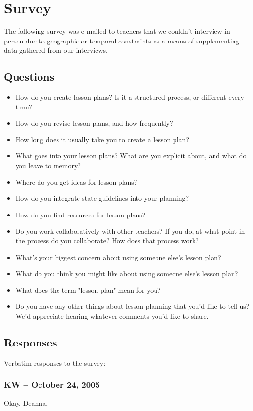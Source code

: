 \documentclass[10pt,letter]{article}
\begin{document}
\section{Survey}
The following survey was e-mailed to teachers that we couldn't interview in
person due to geographic or temporal constraints as a means of supplementing
data gathered from our interviews.

\subsection{Questions}
\begin{itemize}
\item How do you create lesson plans?  Is it a structured process, or different
      every time?
\item How do you revise lesson plans, and how frequently?
\item How long does it usually take you to create a lesson plan?
\item What goes into your lesson plans?  What are you explicit about, and what
      do you leave to memory?
\item Where do you get ideas for lesson plans?
\item How do you integrate state guidelines into your planning?
\item How do you find resources for lesson plans?
\item Do you work collaboratively with other teachers?  If you do, at what point
      in the process do you collaborate?  How does that process work?
\item What's your biggest concern about using someone else's lesson plan?
\item What do you think you might like about using someone else's lesson plan?
\item What does the term "lesson plan" mean for you?
\item Do you have any other things about lesson planning that you'd like to tell
      us?  We'd appreciate hearing whatever comments you'd like to share.
\end{itemize}

\subsection{Responses}
Verbatim responses to the survey:

\subsubsection{KW -- October 24, 2005}
Okay, Deanna,
\end{document}
